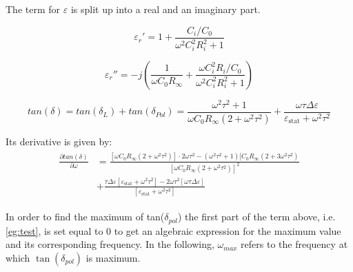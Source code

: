 The term for $\varepsilon$ is split up into a real and an imaginary part. 

\begin{equation}
\varepsilon_r' = 1+ \frac{C_i/C_0}{\omega^2 C_i^2 R_i^2 +1}
\end{equation}

\begin{equation}
\varepsilon_r'' = -j \left(\frac{1}{\omega C_0 R_\infty}+\frac{\omega C_i^2 R_i / C_0}{\omega^2 C_i^2 R_i^2 +1} \right)
\end{equation}

\begin{equation}
tan(\delta) = tan(\delta_L) + tan( \delta_{Pol}) = \frac{\omega^2 \tau^2+1}{\omega C_0 R_\infty (2+ \omega^2 \tau^2)}+\frac{\omega \tau \Delta \varepsilon}{\varepsilon_{\textrm{stat}} + \omega^2 \tau^2}
\end{equation}

Its derivative is given by: 
\begin{align}
\begin{split}
\frac{\partial tan(\delta)}{ \partial \omega} & = \frac{[\omega C_0 R_\infty (2+\omega^2 \tau^2)]\cdot 2 \omega \tau^2 - (\omega^2 \tau^2 +1) [C_0 R_\infty (2+3 \omega^2 \tau^2)  }{[\omega C_0 R_\infty (2+\omega^2 \tau^2)]^2}\\
					      & + \frac{\tau \Delta \varepsilon [\varepsilon_{\textrm{stat}} + \omega^2 \tau^2] - 2 \omega \tau^2 [\omega \tau \Delta \varepsilon]}{[\varepsilon_{\textrm{stat}} +\omega^2 \tau^2]}
\label{eg:test}
\end{split}
\end{align}
					      
In order to find the maximum of tan($\delta_{pol}$) the first part of the term above, i.e. \eqref{eg:test}, is set equal to 0 to get an algebraic expression for the maximum value and its corresponding frequency. In the following, $\omega_{max}$ refers to the frequency at which $\tan(\delta_{pol})$ is maximum.

